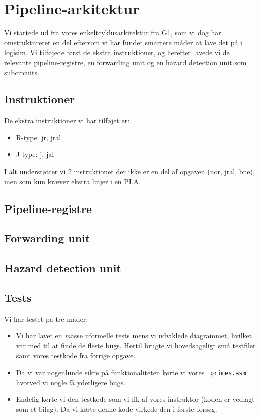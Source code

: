 \section{Pipeline-arkitektur}

Vi startede ud fra vores enkeltcyklusarkitektur fra G1, som vi dog har omstruktureret en del
eftersom vi har fundet smartere måder at lave det på i logisim. Vi tilføjede først de ekstra
instruktioner, og herefter lavede vi de relevante pipeline-registre, en forwarding unit og 
en hazard detection unit som subcircuits.  

\subsection{Instruktioner}
De ekstra instruktioner vi har tilføjet er:
\begin{itemize}
\item R-type: jr, jral
\item J-type: j, jal
\end{itemize}

I alt understøtter vi 2 instruktioner der ikke er en del af opgaven (nor, jral, bne), men som kun kræver ekstra
linjer i en PLA. 

\subsection{Pipeline-registre}

\subsection{Forwarding unit}

\subsection{Hazard detection unit}


\subsection{Tests}
Vi har testet på tre måder:
\begin{itemize}
\item Vi har lavet en {\emph masse} uformelle tests mens vi udviklede
diagrammet, hvilket var med til at finde de fleste bugs. Hertil brugte vi
hovedsageligt små testfiler samt vores testkode fra forrige opgave.
\item Da vi var nogenlunde sikre på funktionaliteten kørte vi vores {\tt
primes.asm} hvorved vi nogle få yderligere bugs.
\item Endelig kørte vi den testkode som vi fik af vores instruktor (koden er
vedlagt som et bilag). Da vi kørte denne kode virkede den i første forsøg.
\end{itemize}
